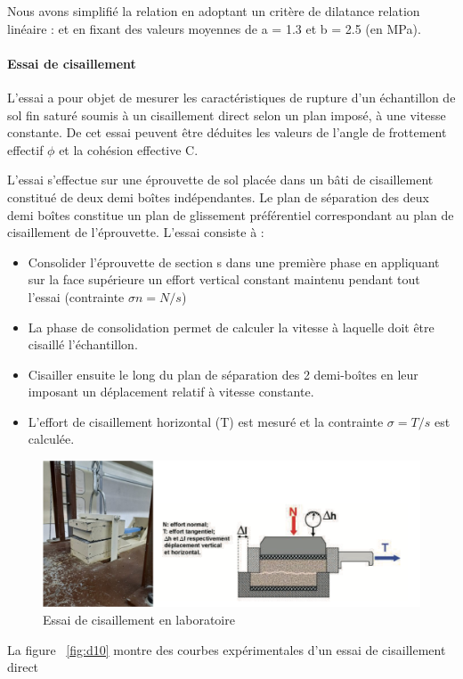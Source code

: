 \documentclass[11pt,french,a4paper]{article}
\begin{document}
Nous avons simplifié la relation en adoptant un critère de dilatance relation linéaire : et en fixant des valeurs moyennes de a = 1.3 et b = 2.5 (en MPa). 
\paragraph{Essai de cisaillement}

L’essai a pour objet de mesurer les caractéristiques de rupture d’un échantillon de sol fin saturé soumis à un cisaillement direct selon un plan imposé, à une vitesse constante. De cet essai peuvent être déduites les valeurs de l’angle de frottement effectif $\phi$ et la cohésion effective C. 

L’essai s’effectue sur une éprouvette de sol placée dans un bâti de cisaillement constitué de deux demi boîtes indépendantes. Le plan de séparation des deux demi boîtes constitue un plan de glissement préférentiel correspondant au plan de cisaillement de l’éprouvette.
L’essai consiste à : 
\begin{itemize}
\item Consolider l’éprouvette de section s dans une première phase en appliquant sur la face supérieure un effort vertical constant maintenu pendant tout l’essai (contrainte $\sigma n=N/s$)
\item La phase de consolidation permet de calculer la vitesse à laquelle doit être cisaillé l’échantillon.
\item Cisailler ensuite le long du plan de séparation des 2 demi-boîtes en leur imposant un déplacement relatif à vitesse constante.
\item L’effort de cisaillement horizontal (T) est mesuré et la contrainte   $\sigma=T/s$ est calculée.
\end{itemize}

\begin{figure}[h]
\centering
\includegraphics[width=.7\linewidth]{image/annexe/annexe_D/D9.png}
\caption{Essai de cisaillement en laboratoire}
\label{fig:d9}
\end{figure}
\FloatBarrier


La figure ~\ref{fig:d10} montre des courbes expérimentales d'un essai de cisaillement direct 
\end{document}
